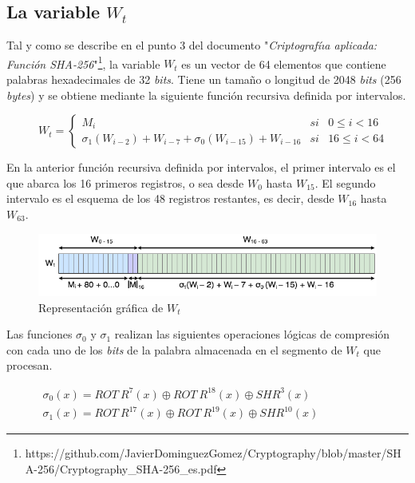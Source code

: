 \documentclass{article}
\begin{document}
    \subsection{La variable $W_t$}
        Tal y como se describe en el punto 3 del documento "\textit{Criptografíıa aplicada: Función SHA-256}"\footnote{https://github.com/JavierDominguezGomez/Cryptography/blob/master/SHA-256/Cryptography\_SHA-256\_es.pdf}, la variable $W_{t}$ es un vector de 64 elementos que contiene palabras hexadecimales de 32 \textit{bits}. Tiene un tamaño o longitud de 2048 \textit{bits} (256 \textit{bytes}) y se obtiene mediante la siguiente función recursiva definida por intervalos.
            \begin{figure}[H]
            \centering
                $W_{t} = \left \{
                \begin{array}{lcl}
                    M_{i} & si & 0 \le i < 16 \\
                    \sigma_{1}(W_{i-2})+W_{i-7}+\sigma_{0}(W_{i-15})+W_{i-16} & si & 16 \le i < 64
                \end{array}
                \right .$
            \end{figure}
        En la anterior función recursiva definida por intervalos, el primer intervalo es el que abarca los 16 primeros registros, o sea desde $W_{0}$ hasta $W_{15}$. El segundo intervalo es el esquema de los 48 registros restantes, es decir, desde $W_{16}$ hasta $W_{63}$.
            \begin{figure}[H]
            \centering
                \includegraphics[scale=0.5]{img/SHA-256-Wt.png}
                \caption{Representación gráfica de $W_{t}$}
            \end{figure}
        Las funciones $\sigma_{0}$ y $\sigma_{1}$ realizan las siguientes operaciones lógicas de compresión con cada uno de los \textit{bits} de la palabra almacenada en el segmento de $W_t$ que procesan.
        \begin{figure}[H]
        \centering
            $\begin{array}{l}
                \sigma_{0}(x) = ROT \ R^{7}(x) \oplus ROT \ R^{18}(x) \oplus SHR^{3}(x) \\
                \sigma_{1}(x) = ROT \ R^{17}(x) \oplus ROT \ R^{19}(x) \oplus SHR^{10}(x)
            \end{array}$
        \end{figure}
        
\end{document}
